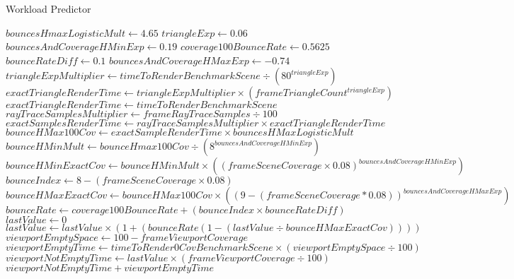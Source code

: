 ﻿\documentclass[a4paper]{article}
\begin{document}
    \begin{algorithm}
        \caption{Workload Predictor}\label{alg:cap}
        \begin{algorithmic}[1]
            \State $bouncesHmaxLogisticMult \gets 4.65$
            \State $triangleExp \gets 0.06$
            \State $bouncesAndCoverageHMinExp \gets 0.19$
            \State $coverage100BounceRate \gets 0.5625$
            \State $bounceRateDiff \gets 0.1$
            \State $bouncesAndCoverageHMaxExp \gets -0.74$
            \newline
                \State $triangleExpMultiplier \gets timeToRenderBenchmarkScene \div (80 ^ {triangleExp})$
                \State $exactTriangleRenderTime \gets triangleExpMultiplier \times (frameTriangleCount ^ {triangleExp})$
            \Else
                \State $exactTriangleRenderTime \gets timeToRenderBenchmarkScene$
            \EndIf
            \newline
            \State $rayTraceSamplesMultiplier \gets frameRayTraceSamples \div 100$
            \State $exactSamplesRenderTime \gets rayTraceSamplesMultiplier \times exactTriangleRenderTime$
            \newline
            \State $bounceHMax100Cov \gets exactSampleRenderTime \times bouncesHMaxLogisticMult$
            \State $bounceHMinMult \gets bounceHmax100Cov \div (8 ^ {bouncesAndCoverageHMinExp})$
            \State $bounceHMinExactCov \gets bounceHMinMult \times ((frameSceneCoverage \times 0.08) ^ {bouncesAndCoverageHMinExp})$
            \State $bounceIndex \gets 8 - (frameSceneCoverage \times 0.08)$
            \State $bounceHMaxExactCov \gets bounceHMax100Cov \times ((9 - (frameSceneCoverage * 0.08)) ^ {bouncesAndCoverageHMaxExp})$
            \State $bounceRate \gets coverage100BounceRate + (bounceIndex \times bounceRateDiff)$
            \newline
            \State $lastValue \gets 0$
                \State $lastValue \gets lastValue \times (1 + (bounceRate (1 - (lastValue \div bounceHMaxExactCov))))$
            \EndFor
            \newline
            \State $viewportEmptySpace \gets 100 - frameViewportCoverage$
            \State $viewportEmptyTime \gets timeToRender0CovBenchmarkScene \times (viewportEmptySpace \div 100)$
            \State $viewportNotEmptyTime \gets lastValue \times (frameViewportCoverage \div 100)$
            \newline\Return $viewportNotEmptyTime + viewportEmptyTime$
        \end{algorithmic}
    \end{algorithm}
\end{document}
